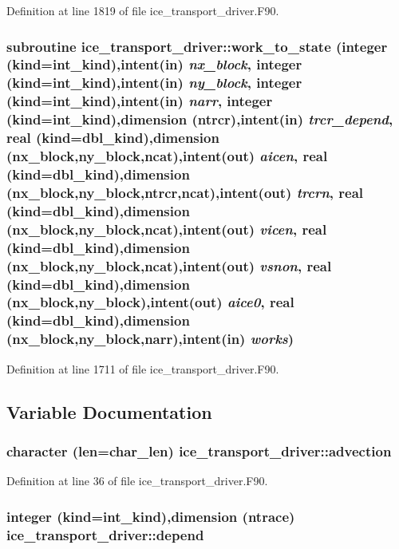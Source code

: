 Definition at line 1819 of file ice\_\-transport\_\-driver.F90.\hypertarget{namespaceice__transport__driver_a20f15deea681c348f6f2032c7db58c50}{
\subsubsection[{work\_\-to\_\-state}]{\setlength{\rightskip}{0pt plus 5cm}subroutine ice\_\-transport\_\-driver::work\_\-to\_\-state (integer (kind=int\_\-kind),intent(in) {\em nx\_\-block}, \/  integer (kind=int\_\-kind),intent(in) {\em ny\_\-block}, \/  integer (kind=int\_\-kind),intent(in) {\em narr}, \/  integer (kind=int\_\-kind),dimension (ntrcr),intent(in) {\em trcr\_\-depend}, \/  real (kind=dbl\_\-kind),dimension (nx\_\-block,ny\_\-block,ncat),intent(out) {\em aicen}, \/  real (kind=dbl\_\-kind),dimension (nx\_\-block,ny\_\-block,ntrcr,ncat),intent(out) {\em trcrn}, \/  real (kind=dbl\_\-kind),dimension (nx\_\-block,ny\_\-block,ncat),intent(out) {\em vicen}, \/  real (kind=dbl\_\-kind),dimension (nx\_\-block,ny\_\-block,ncat),intent(out) {\em vsnon}, \/  real (kind=dbl\_\-kind),dimension (nx\_\-block,ny\_\-block),intent(out) {\em aice0}, \/  real (kind=dbl\_\-kind),dimension (nx\_\-block,ny\_\-block,narr),intent(in) {\em works})}}
\label{namespaceice__transport__driver_a20f15deea681c348f6f2032c7db58c50}


Definition at line 1711 of file ice\_\-transport\_\-driver.F90.

\subsection{Variable Documentation}
\hypertarget{namespaceice__transport__driver_a1c58448ed0a2533736be3ffabe94127f}{
\subsubsection[{advection}]{\setlength{\rightskip}{0pt plus 5cm}character (len=char\_\-len) {\bf ice\_\-transport\_\-driver::advection}}}
\label{namespaceice__transport__driver_a1c58448ed0a2533736be3ffabe94127f}


Definition at line 36 of file ice\_\-transport\_\-driver.F90.\hypertarget{namespaceice__transport__driver_ab13adb14cbe8d413f23beb0e75252023}{
\subsubsection[{depend}]{\setlength{\rightskip}{0pt plus 5cm}integer (kind=int\_\-kind),dimension ({\bf ntrace}) {\bf ice\_\-transport\_\-driver::depend}}}
\label{namespaceice__transport__driver_ab13adb14cbe8d413f23beb0e75252023}


